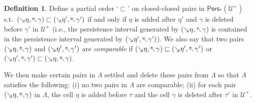 \documentclass[letterpaper,11pt]{article}
\theoremstyle{mythmstyle}
\theoremstyle{mydefstyle}
\newtheorem{definition}{Definition}
\theoremstyle{plain}
\theoremstyle{definition}
\newtheorem{definition}[theorem]{Definition}
\newcommand{\Pers}{\mathsf{Pers}}
\newcommand{\<}[1]{\langle #1\rangle}
\newcommand{\add}[1]{\mskip-2.5mu\rotatebox[origin=c]{-45}{${\rightarrow}$}{#1}}
\newcommand{\del}[1]{\mskip-2.5mu\rotatebox[origin=c]{-45}{${\leftarrow}$}{#1}}
\newcommand{\Ucal}{\mathcal{U}}
\newcommand{\LG}{\Lambda}
\newcommand{\ccleq}{\sqsubset}
\let\defemph\emph
\begin{document}
\begin{definition}
Define a partial order `$\ccleq$' on closed-closed pairs
in $\Pers_*(\Ucal^+)$ s.t.\ 
$(\add{\eta},\del{\gamma})\ccleq(\add{\eta'},\del{\gamma'})$ 
if and only if  $\eta$ is added after $\eta'$
and $\gamma$ is deleted before $\gamma'$ in $\Ucal^+$
(i.e., the persistence interval generated by $(\add{\eta},\del{\gamma})$
is contained in the persistence interval 
generated by $(\add{\eta'},\del{\gamma'})$).
We also say that two pairs
$(\add{\eta},\del{\gamma})$ and $(\add{\eta'},\del{\gamma'})$ 
are \defemph{comparable} if $(\add{\eta},\del{\gamma})\ccleq(\add{\eta'},\del{\gamma'})$ 
or $(\add{\eta'},\del{\gamma'})\ccleq(\add{\eta},\del{\gamma})$.
\end{definition}

We then make certain pairs in $\LG$ settled and delete these pairs from $\LG$
so that $\LG$ satisfies the following:
(i) no two pairs in $\LG$ are comparable;
(ii) for each pair $(\add{\eta},\del{\gamma})$ in $\LG$,
the cell $\eta$ is added before $\tau$
and the cell $\gamma$ is deleted after $\tau'$ in $\Ucal^+$.
\end{document}
